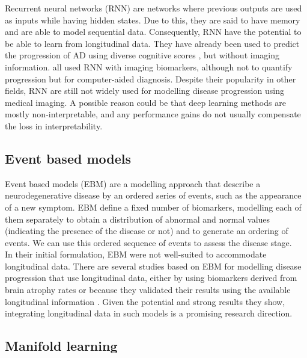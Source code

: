 Recurrent neural networks (RNN) are networks where previous outputs are used as inputs while having hidden states. Due to this, they are said to have memory and are able to model sequential data. Consequently, RNN have the potential to be able to learn from longitudinal data. They have already been used to predict the progression of AD using diverse cognitive scores \cite{Wang2018}, but without imaging information. \cite{Ghazi2019,Cui2018,Aghili2018} all used RNN with imaging biomarkers, although not to quantify progression but for computer-aided diagnosis. Despite their popularity in other fields, RNN are still not widely used for modelling disease progression using medical imaging. A possible reason could be that deep learning methods are mostly non-interpretable, and any performance gains do not usually compensate the loss in interpretability. \\ 

\subsection{Event based models}

Event based models (EBM) \cite{Fonteijn2012} are a modelling approach that describe a neurodegenerative disease by an ordered series of events, such as the appearance of a new symptom. EBM define a fixed number of biomarkers, modelling each of them separately to obtain a distribution of abnormal and normal values (indicating the presence of the disease or not) and to generate an ordering of events. We can use this ordered sequence of events to assess the disease stage. \\

In their initial formulation, EBM were not well-suited to accommodate longitudinal data. There are several studies based on EBM for modelling disease progression that use longitudinal data, either by using biomarkers derived from brain atrophy rates \cite{Fonteijn2012,Huang2012,Young2014} or because they validated their results using the available longitudinal information \cite{Oxtoby2018,Young2014}. Given the potential and strong results they show, integrating longitudinal data in such models is a promising research direction. \\

\subsection{Manifold learning}

